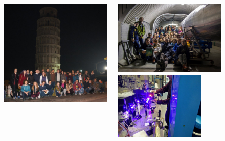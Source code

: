 \documentclass{Bredelebeamer}
\begin{document}
\begin{frame}{}
\vspace{2mm}
\begin{figure}
\begin{columns}
\begin{column}{0.5\textwidth}
\includegraphics[width=5.5cm]{images/LoT4.jpg} \\
\end{column}
\vspace{2mm}
\begin{column}{0.5\textwidth}
\includegraphics[width=5.5cm]{images/LoT5.jpg}
\\ \vspace{0.2cm}
\centering
\includegraphics[width=4.3cm]{images/LoT3.jpg}
\end{column}
\end{columns}
\end{figure}
\end{frame}
\end{document}

